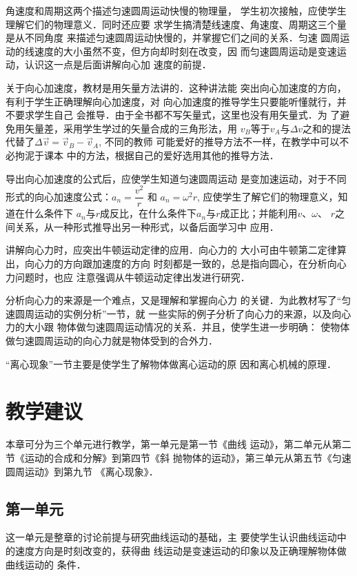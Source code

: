 角速度和周期这两个描述匀速圆周运动快慢的物理量，
学生初次接触，应使学生理解它们的物理意义．同时还应要
求学生搞清楚线速度、角速度、周期这三个量是从不同角度
来描述匀速圆周运动快慢的，并掌握它们之间的关系．匀速
圆周运动的线速度的大小虽然不变，但方向却时刻在改变，因
而匀速圆周运动是变速运动，认识这一点是后面讲解向心加
速度的前提．

关于向心加速度，教材是用矢量方法讲的．这种讲法能
突出向心加速度的方向，有利于学生正确理解向心加速度，对
向心加速度的推导学生只要能听懂就行，并不要求学生自己
会推导．由于全书都不写矢量式，这里也没有用矢量式．为
了避免用矢量差，采用学生学过的矢量合成的三角形法，用
$v_B$等于$v_A$与$\Delta v$之和的提法代替了$\Delta \vec{v}=\vec{v}_B-\vec{v}_A$, 不同的教师
可能爱好的推导方法不一样，在教学中可以不必拘泥于课本
中的方法，根据自己的爱好选用其他的推导方法．

导出向心加速度的公式后，应使学生知道匀速圆周运动
是变加速运动，对于不同形式的向心加速度公式：$a_n=\dfrac{v^2}{r}$
和
$a_n=\omega^2 r$, 应使学生了解它们的物理意义，知道在什么条件下
$a_n$与$r$成反比，在什么条件下$a_n$与$r$成正比；并能利用$v$、$\omega$、
$r$之间关系，从一种形式推导出另一种形式，以备后面学习中
应用．

讲解向心力时，应突出牛顿运动定律的应用．向心力的
大小可由牛顿第二定律算出，向心力的方向跟加速度的方向
时刻都是一致的，总是指向圆心，在分析向心力问题时，也应
注意强调从牛顿运动定律出发进行研究．

分析向心力的来源是一个难点，又是理解和掌握向心力
的关键．为此教材写了“匀速圆周运动的实例分析”一节，就
一些实际的例子分析了向心力的来源，以及向心力的大小跟
物体做匀速圆周运动情况的关系．并且，使学生进一步明确：
使物体做匀速圆周运动的向心力就是物体受到的合外力．

“离心现象”一节主要是使学生了解物体做离心运动的原
因和离心机械的原理．

\section{教学建议}
本章可分为三个单元进行教学，第一单元是第一节《曲线
运动》，第二单元从第二节《运动的合成和分解》到第四节《斜
抛物体的运动》，第三单元从第五节《匀速圆周运动》到第九节
《离心现象》．

\subsection{第一单元}
这一单元是整章的讨论前提与研究曲线运动的基础，主
要使学生认识曲线运动中的速度方向是时刻改变的，获得曲
线运动是变速运动的印象以及正确理解物体做曲线运动的
条件．

